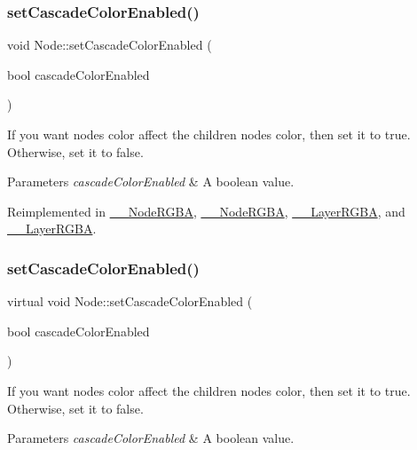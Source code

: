 \subsubsection{\texorpdfstring{set\+Cascade\+Color\+Enabled()}{setCascadeColorEnabled()}\hspace{0.1cm}{\footnotesize\ttfamily [1/2]}}
{\footnotesize\ttfamily void Node\+::set\+Cascade\+Color\+Enabled (\begin{DoxyParamCaption}\item[{bool}]{cascade\+Color\+Enabled }\end{DoxyParamCaption})\hspace{0.3cm}{\ttfamily [virtual]}}

If you want node\textquotesingle{}s color affect the children node\textquotesingle{}s color, then set it to true. Otherwise, set it to false. 
\begin{DoxyParams}{Parameters}
{\em cascade\+Color\+Enabled} & A boolean value. \\
\hline
\end{DoxyParams}


Reimplemented in \hyperlink{class____NodeRGBA_a07c6d23e55cc2ba21115d2b93ef25bcd}{\+\_\+\+\_\+\+Node\+R\+G\+BA}, \hyperlink{class____NodeRGBA_a07c6d23e55cc2ba21115d2b93ef25bcd}{\+\_\+\+\_\+\+Node\+R\+G\+BA}, \hyperlink{class____LayerRGBA_a6559d3d54c2a7a8a35873390043b0aa6}{\+\_\+\+\_\+\+Layer\+R\+G\+BA}, and \hyperlink{class____LayerRGBA_a6559d3d54c2a7a8a35873390043b0aa6}{\+\_\+\+\_\+\+Layer\+R\+G\+BA}.

\mbox{\label{classNode_a0638fb9f5b4c522e75ee4ad01393bb48}} 
\subsubsection{\texorpdfstring{set\+Cascade\+Color\+Enabled()}{setCascadeColorEnabled()}\hspace{0.1cm}{\footnotesize\ttfamily [2/2]}}
{\footnotesize\ttfamily virtual void Node\+::set\+Cascade\+Color\+Enabled (\begin{DoxyParamCaption}\item[{bool}]{cascade\+Color\+Enabled }\end{DoxyParamCaption})\hspace{0.3cm}{\ttfamily [virtual]}}

If you want node\textquotesingle{}s color affect the children node\textquotesingle{}s color, then set it to true. Otherwise, set it to false. 
\begin{DoxyParams}{Parameters}
{\em cascade\+Color\+Enabled} & A boolean value. \\
\hline
\end{DoxyParams}


